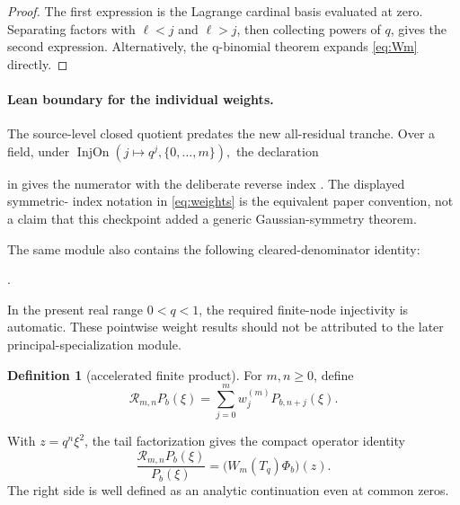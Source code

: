 \documentclass[11pt]{article}
\theoremstyle{definition}
\newtheorem{definition}[theorem]{Definition}
\theoremstyle{remark}
\begin{document}
\begin{proof}
The first expression is the Lagrange cardinal basis evaluated at zero. Separating
factors with \(\ell<j\) and \(\ell>j\), then collecting powers of \(q\), gives the
second expression. Alternatively, the q-binomial theorem expands
\eqref{eq:Wm} directly.
\end{proof}

\paragraph{Lean boundary for the individual weights.}
The source-level closed quotient predates the new all-residual tranche.  Over a field, under
\(
 \operatorname{InjOn}(j\mapsto q^j,\{0,\ldots,m\}),
\)
the declaration
\begin{center}
\end{center}
in  gives the numerator with the deliberate
reverse index .  The displayed symmetric-
index notation in \eqref{eq:weights} is the equivalent paper convention, not a
claim that this checkpoint added a generic Gaussian-symmetry theorem.
\begin{samepage}
The same module also contains the following cleared-denominator identity:
\begin{center}
.
\end{center}
\end{samepage}
In the present
real range \(0<q<1\), the required finite-node injectivity is automatic.  These
pointwise weight results should not be attributed to the later
principal-specialization module.

\begin{definition}[accelerated finite product]
For \(m,n\geq0\), define
\begin{equation}
 \mathcal R_{m,n}P_b(\xi)
 =\sum_{j=0}^m w_j^{(m)}P_{b,n+j}(\xi).
 \label{eq:Rdef}
\end{equation}
\end{definition}

With \(z=q^n\xi^2\), the tail factorization gives the compact operator identity
\begin{equation}
 \frac{\mathcal R_{m,n}P_b(\xi)}{P_b(\xi)}
 =\bigl(W_m(T_q)\Phi_b\bigr)(z).
 \label{eq:operatoridentity}
\end{equation}
The right side is well defined as an analytic continuation even at common zeros.
\end{document}
